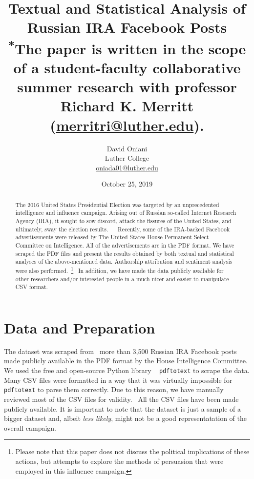 \documentclass[12pt]{article}
\author{David Oniani\\
        Luther College\\
        \href{mailto:oniada01@luther.edu}{oniada01@luther.edu}}
\title{\textbf{Textual and Statistical Analysis of Russian IRA Facebook Posts}\\
      \small \textsuperscript{*}The paper is written in the scope of a student-faculty collaborative\\
                                summer research with professor Richard K. Merritt (\href{mailto:merritri@luther.edu}{merritri@luther.edu}).}
\date{October 25, 2019}
\theoremstyle{definition}
\begin{document}
\maketitle


\begin{abstract}

\noindent The 2016 United States Presidential Election was targeted by an
unprecedented intelligence and influence campaign. Arising out of Russian
so-called Internet Research Agency (IRA), it sought to sow discord, attack
the fissures of the United States, and ultimately, sway the election results.
~\cite{ira2016}~\cite{ira2016data} Recently, some of the IRA-backed Facebook
advertisements were released by The United States House Permanent Select
Committee on Intelligence. All of the advertisements are in the PDF format. We
have scraped the PDF files and present the results obtained by both textual and
statistical analyses of the above-mentioned data. Authorship attribution and
sentiment analysis were also performed.~\footnote{Please note that this paper
does not discuss the political implications of these actions, but attempts to
explore the methods of persuasion that were employed in this influence
campaign.}~\cite{ira2016csvdata} In addition, we have made the data publicly
available for other researchers and/or interested people in a much nicer and
easier-to-manipulate CSV format.
\end{abstract}


\newpage
\tableofcontents
\newpage


\section*{\centering Data and Preparation}

The dataset was scraped from~\cite{ira2016data} more than 3,500 Russian IRA
Facebook posts made publicly available in the PDF format by the House
Intelligence Committee. We used the free and open-source Python library
~\cite{pdftotext} \texttt{pdftotext} to scrape the data. Many CSV files were
formatted in a way that it was virtually impossible for \texttt{pdftotext} to
parse them correctly. Due to this reason, we have manually reviewed most of the
CSV files for validity.~\cite{ira2016csvdata} All the CSV files have been made
publicly available. It is important to note that the dataset is just a sample
of a bigger dataset and, albeit \textit{less likely}, might not be a good
representatation of the overall campaign.
\end{document}
